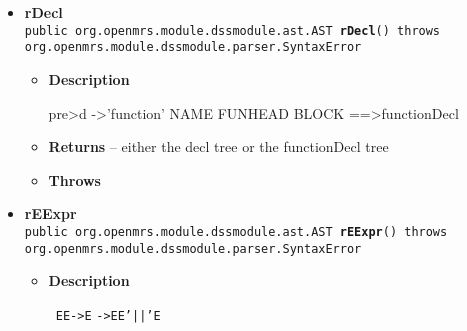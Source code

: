 {{{{{\begin{itemize}
{\begin{itemize}
{pre\textgreater  block -\textgreater  '\{' s* '\}' ==\textgreater  block
}
\item{{\bf  Returns} -- 
block tree 
}%
\item{{\bf  Throws}
}%
\end{itemize}
}%
\item{ 
\hypertarget{org.openmrs.module.dssmodule.parser.Parser.rDecl()}{{\bf  rDecl}\\}
\texttt{public org.openmrs.module.dssmodule.ast.AST\ {\bf  rDecl}() throws org.openmrs.module.dssmodule.parser.SyntaxError
\label{org.openmrs.module.dssmodule.parser.Parser.rDecl()}}%
\begin{itemize}
\item{
{\bf  Description}

pre\textgreater  d -\textgreater  'function' NAME FUNHEAD BLOCK ==\textgreater  functionDecl
}
\item{{\bf  Returns} -- 
either the decl tree or the functionDecl tree 
}%
\item{{\bf  Throws}
}%
\end{itemize}
}%
\item{ 
\hypertarget{org.openmrs.module.dssmodule.parser.Parser.rEExpr()}{{\bf  rEExpr}\\}
\texttt{public org.openmrs.module.dssmodule.ast.AST\ {\bf  rEExpr}() throws org.openmrs.module.dssmodule.parser.SyntaxError
\label{org.openmrs.module.dssmodule.parser.Parser.rEExpr()}}%
\begin{itemize}
\item{
{\bf  Description}

\texttt{\small
\mbox{}\newline \phantom{ }EE\phantom{ }-\textgreater \phantom{ }E}\mbox{}\newline
\texttt{\small \phantom{ }\phantom{ }\phantom{ }\phantom{ }-\textgreater \phantom{ }EE\phantom{ }'||'\phantom{ }E}\mbox{}\newline
\texttt{\small \phantom{ }}

}
\end{itemize}}
\end{itemize}}}}}}
